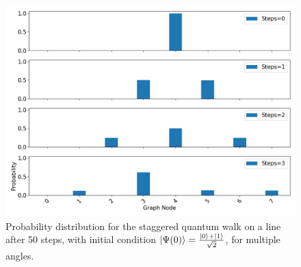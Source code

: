 \documentclass[../../dissertation.tex]{subfiles}
\begin{document}
\begin{figure}[!h]
	\centering
	\includegraphics[scale=0.40]{img/Qiskit/CoinedQuantumWalk/CoinedQW_N3_S0123.png}
	\caption{Probability distribution for the staggered quantum walk on a line after 50 steps, with initial condition $\ket{\Psi(0)}=\frac{\ket{0}+\ket{1}}{\sqrt{2}}$, for multiple angles.} 
	\label{fig:fig5}
\end{figure}
\end{document}
